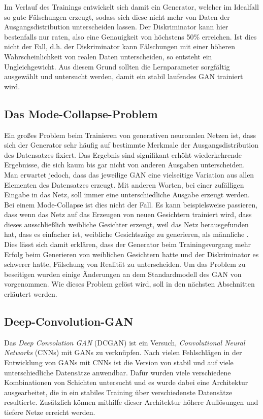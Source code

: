 Im Verlauf des Trainings entwickelt sich damit ein Generator, welcher im
Idealfall so gute Fälschungen erzeugt, sodass sich diese nicht mehr von Daten
der Ausgangsdistribution unterscheiden lassen. Der Diskriminator kann hier
bestenfalls nur raten, also eine Genauigkeit von höchstens 50\%
erreichen. Ist dies nicht der Fall, d.h. der Diskriminator kann Fälschungen
mit einer höheren Wahrscheinlichkeit von realen Daten unterscheiden, so
entsteht ein Ungleichgewicht. Aus diesem Grund sollten die Lernparameter
sorgfältig ausgewählt und untersucht werden, damit ein stabil laufendes GAN
trainiert wird.

\subsection{Das Mode-Collapse-Problem}
Ein großes Problem beim Trainieren von generativen neuronalen Netzen ist, dass
sich der Generator sehr häufig auf bestimmte Merkmale der Ausgangsdistribution
des Datensatzes fixiert. Das Ergebnis sind signifikant erhöht wiederkehrende
Ergebnisse, die sich kaum bis gar nicht von anderen Ausgaben unterscheiden.
Man erwartet jedoch, dass das jeweilige GAN eine vielseitige Variation aus
allen Elementen des Datensatzes erzeugt. Mit anderen Worten, bei einer
zufälligen Eingabe in das Netz, soll immer eine unterschiedliche Ausgabe
erzeugt werden. Bei einem Mode-Collapse ist dies nicht der Fall. Es kann
beispielsweise passieren, dass wenn das Netz auf das Erzeugen von neuen
Gesichtern trainiert wird, dass dieses ausschließlich weibliche Gesichter
erzeugt, weil das Netz herausgefunden hat, dass es einfacher ist, weibliche
Gesichtszüge zu generieren, als männliche \cite{richardson2018gans}. Dies
lässt sich damit erklären, dass der Generator beim Trainingsvorgang mehr
Erfolg beim Generieren von weiblichen Gesichtern hatte und der Diskriminator
es schwerer hatte, Fälschung von Realität zu unterscheiden. Um das Problem zu
beseitigen wurden einige Änderungen an dem Standardmodell des GAN von
\cite{goodfellow2014generative} vorgenommen. Wie dieses Problem gelöst wird,
soll in den nächsten Abschnitten erläutert werden.

\subsection{Deep-Convolution-GAN}
Das \textit{Deep Convolution GAN} (DCGAN) ist ein Versuch,
\textit{Convolutional Neural Networks} (CNNs) mit GANs zu verknüpfen. Nach
vielen Fehlschlägen in der Entwicklung von GANs mit CNNs ist die Version von
\cite{radford2016unsupervised} stabil und auf viele unterschiedliche
Datensätze anwendbar. Dafür wurden viele verschiedene Kombinationen von
Schichten untersucht und es wurde dabei eine Architektur ausgearbeitet, die
in ein stabiles Training über verschiedenste Datensätze resultierte.
Zusätzlich können mithilfe dieser Architektur höhere Auflösungen und tiefere
Netze erreicht werden.

